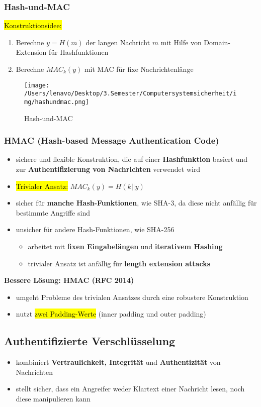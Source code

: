 \documentclass[a4paper, 10pt]{article}
\begin{document}
\subsubsection{Hash-und-MAC}
\hl{Konstruktionsidee:}
\begin{enumerate}
    \item Berechne $y = H(m)$ der langen Nachricht $m$ mit Hilfe von Domain-Extension für Hashfunktionen
    \item Berechne $MAC_k(y)$ mit MAC für fixe Nachrichtenlänge
\end{enumerate}

\begin{figure}[h]
    \centering
    \texttt{[image: /Users/lenavo/Desktop/3.Semester/Computersystemsicherheit/img/hashundmac.png]}
    \caption{Hash-und-MAC}
    \label{fig:enter-label}
\end{figure}
\subsubsection{HMAC (Hash-based Message Authentication Code)}
\begin{itemize}
    \item sichere und flexible Konstruktion, die auf einer \textbf{Hashfunktion} basiert und zur \textbf{Authentifizierung von Nachrichten} verwendet wird
    \item \hl{Trivialer Ansatz:} $MAC_k (y) = H(k||y)$
    \item sicher für \textbf{manche Hash-Funktionen}, wie SHA-3, da diese nicht anfällig für bestimmte Angriffe sind
    \item unsicher für andere Hash-Funktionen, wie SHA-256
    \begin{itemize}
        \item arbeitet mit \textbf{fixen Eingabelängen} und \textbf{iterativem Hashing}
        \item trivialer Ansatz ist anfällig für \textbf{length extension attacks}
    \end{itemize}
\end{itemize}
\textbf{Bessere Lösung: HMAC (RFC 2014)}
\begin{itemize}
    \item umgeht Probleme des trivialen Ansatzes durch eine robustere Konstruktion
    \item nutzt \hl{zwei Padding-Werte} (inner padding und outer padding)
\end{itemize}
\subsection{Authentifizierte Verschlüsselung}
\begin{itemize}
    \item kombiniert \textbf{Vertraulichkeit, Integrität} und \textbf{Authentizität} von Nachrichten
    \item stellt sicher, dass ein Angreifer weder Klartext einer Nachricht lesen, noch diese manipulieren kann
\end{itemize}
\end{document}
